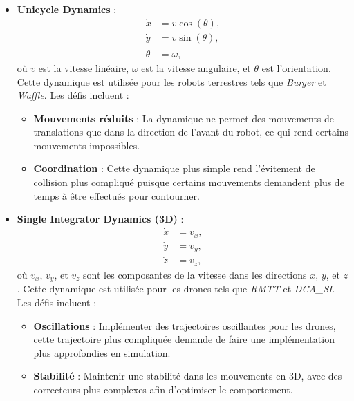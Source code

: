 \documentclass[a4paper,12pt]{article}
\begin{document}
\begin{itemize}
    \item \textbf{Unicycle Dynamics} :
    \begin{equation*}
    \begin{aligned}
    \dot{x} &= v \cos(\theta), \\
    \dot{y} &= v \sin(\theta), \\
    \dot{\theta} &= \omega,
    \end{aligned}
    \end{equation*}
    \noindent où $v$ est la vitesse linéaire, $\omega$ est la vitesse angulaire, et $\theta$ est l'orientation. Cette dynamique est utilisée pour les robots terrestres tels que \textit{Burger} et \textit{Waffle}. Les défis incluent :
    \begin{itemize}
        \item \textbf{Mouvements réduits} : La dynamique ne permet des mouvements de translations que dans la direction de l'avant du robot, ce qui rend certains mouvements impossibles.
        \item \textbf{Coordination} : Cette dynamique plus simple rend l'évitement de collision plus compliqué puisque certains mouvements demandent plus de temps à être effectués pour contourner.
    \end{itemize}

    \item \textbf{Single Integrator Dynamics (3D)} :
    \begin{equation*}
    \begin{aligned}
    \dot{x} &= v_x, \\
    \dot{y} &= v_y, \\
    \dot{z} &= v_z,
    \end{aligned}
    \end{equation*}
    \noindent où $v_x$, $v_y$, et $v_z$ sont les composantes de la vitesse dans les directions $x$, $y$, et $z$. Cette dynamique est utilisée pour les drones tels que \textit{RMTT} et \textit{DCA\_SI}. Les défis incluent :
    \begin{itemize}
        \item \textbf{Oscillations} : Implémenter des trajectoires oscillantes pour les drones, cette trajectoire plus compliquée demande de faire une implémentation plus approfondies en simulation.
        \item \textbf{Stabilité} : Maintenir une stabilité dans les mouvements en 3D, avec des correcteurs plus complexes afin d'optimiser le comportement.
    \end{itemize}


\end{itemize}
\end{document}
